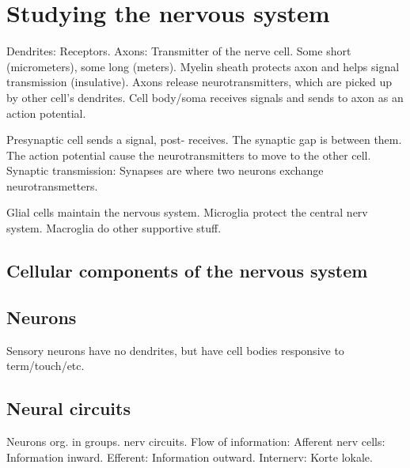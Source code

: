 \section{Studying the nervous system}

Dendrites: Receptors.
Axons: Transmitter of the nerve cell. Some short (micrometers), some long (meters). Myelin sheath protects axon and helps signal transmission (insulative). Axons release neurotransmitters, which are picked up by other cell's dendrites.
Cell body/soma receives signals and sends to axon as an action potential.

Presynaptic cell sends a signal, post- receives. The synaptic gap is between them. The action potential cause the neurotransmitters to move to the other cell.
Synaptic transmission: Synapses are where two neurons exchange neurotransmetters.

Glial cells maintain the nervous system. Microglia protect the central nerv system. Macroglia do other supportive stuff.

\subsection{Cellular components of the nervous system}

\subsection{Neurons}

Sensory neurons have no dendrites, but have cell bodies responsive to term/touch/etc.

\subsection{Neural circuits}

Neurons org. in groups. nerv circuits.
Flow of information:
Afferent nerv cells: Information inward.
Efferent: Information outward.
Internerv: Korte lokale.
